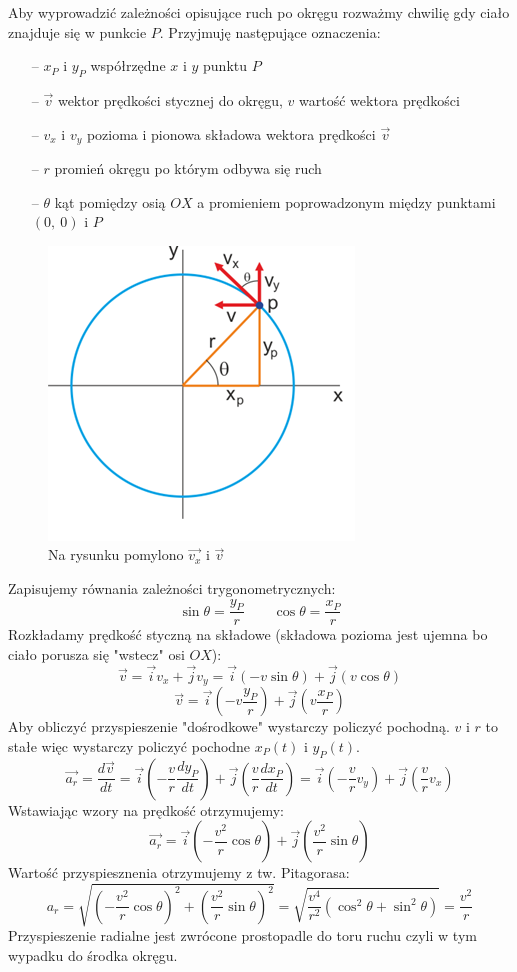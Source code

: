 \documentclass[a4paper]{article}
\begin{document}
    Aby wyprowadzić zależności opisujące ruch po okręgu rozważmy chwilię
    gdy ciało znajduje się w punkcie $P$. Przyjmuję następujące oznaczenia:
    \begin{itemize}
        \item [--] $x_P$ i $y_P$ współrzędne $x$ i $y$ punktu $P$
        \item [--] $\vec{v}$ wektor prędkości stycznej do okręgu, $v$ wartość wektora prędkości
        \item [--] $v_x$ i $v_y$ pozioma i pionowa składowa wektora prędkości $\vec{v}$
        \item [--] $r$ promień okręgu po którym odbywa się ruch
        \item [--] $\theta$ kąt pomiędzy osią $OX$ a promieniem poprowadzonym między punktami $(0,\ 0)$ i $P$
    \end{itemize}
    \begin{figure}[H]
        \centering
        \includegraphics[]{ruchokrag.png}
        \caption{Na rysunku pomylono $\vec{v_x}$ i $\vec{v}$}
    \end{figure}
    Zapisujemy równania zależności trygonometrycznych:
    \[\sin\theta = \frac{y_P}{r} \quad\quad \cos\theta = \frac{x_P}{r}\]
    Rozkładamy prędkość styczną na składowe (składowa pozioma jest ujemna bo ciało porusza się "wstecz" osi $OX$):
    \[\vec{v} = \vec{i}v_x + \vec{j}v_y = \vec{i}(-v \sin\theta) + \vec{j}(v\cos\theta)\]
    \[\vec{v} = \vec{i}\left (-v \frac{y_P}{r} \right ) + \vec{j}\left (v \frac{x_P}{r} \right )\]    
    Aby obliczyć przyspieszenie "dośrodkowe" wystarczy policzyć pochodną. $v$ i $r$ to stałe więc wystarczy 
    policzyć pochodne $x_P(t)$ i $y_P(t)$.
    \[\vec{a_r} = \frac{d\vec{v}}{dt} =
    \vec{i}\left (-\frac{v}{r} \frac{dy_P}{dt} \right ) + \vec{j}\left (\frac{v}{r} \frac{dx_P}{dt} \right ) 
    = \vec{i}\left (-\frac{v}{r} v_y \right ) + \vec{j}\left (\frac{v}{r} v_x \right ) \]
    Wstawiając wzory na prędkość otrzymujemy:
    \[\vec{a_r} = \vec{i}\left (-\frac{v^2}{r} \cos\theta \right ) + \vec{j}\left (\frac{v^2}{r} \sin\theta \right )\]
    Wartość przyspiesznenia otrzymujemy z tw. Pitagorasa:
    \[a_r = \sqrt{\left (-\frac{v^2}{r} \cos\theta \right )^2 + \left (\frac{v^2}{r} \sin\theta \right )^2} = \sqrt{\frac{v^4}{r^2}(\cos^2\theta + \sin^2\theta)} = \frac{v^2}{r}\]
    Przyspieszenie radialne jest zwrócone prostopadle do toru ruchu czyli w tym wypadku do 
    środka okręgu. 
\end{document}
